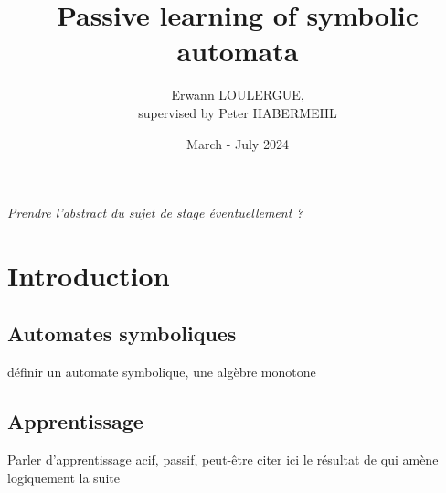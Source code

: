 \documentclass[12pt, a4paper]{article}
\title{Passive learning of symbolic automata}
\author{Erwann LOULERGUE, \\ supervised by Peter HABERMEHL}
\date{March - July 2024}
\begin{document}
    \maketitle
	
	\textit{Prendre l'abstract du sujet de stage éventuellement ?}
	
	\newpage

	\section{Introduction}
	\subsection{Automates symboliques}
	définir un automate symbolique, une algèbre monotone
	\subsection{Apprentissage}
	Parler d'apprentissage acif, passif, peut-être citer ici le résultat de \cite{FFZ} qui amène logiquement la suite

	\newpage

	\section{}

	\printbibliography
\end{document}
